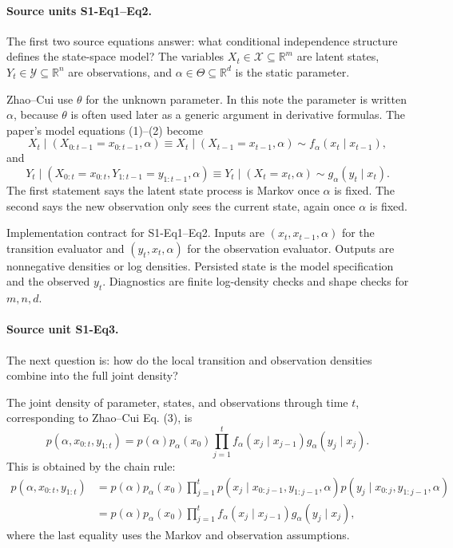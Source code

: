 \documentclass[11pt]{article}
\newcommand{\R}{\mathbb R}
\begin{document}
\paragraph{Source units S1-Eq1--Eq2.}
The first two source equations answer: what conditional independence structure
defines the state-space model?  The variables \(X_t\in\mathcal X\subseteq\R^m\)
are latent states, \(Y_t\in\mathcal Y\subseteq\R^n\) are observations, and
\(\alpha\in\Theta\subseteq\R^d\) is the static parameter.

Zhao--Cui use \(\theta\) for the unknown parameter.  In this note the parameter
is written \(\alpha\), because \(\theta\) is often used later as a generic
argument in derivative formulas.  The paper's model equations (1)--(2) become
\[
    X_t\mid (X_{0:t-1}=x_{0:t-1},\alpha)
    \equiv
    X_t\mid (X_{t-1}=x_{t-1},\alpha)
    \sim f_\alpha(x_t\mid x_{t-1}),
    \tag{BF-1}
\]
and
\[
    Y_t\mid (X_{0:t}=x_{0:t},Y_{1:t-1}=y_{1:t-1},\alpha)
    \equiv
    Y_t\mid (X_t=x_t,\alpha)
    \sim g_\alpha(y_t\mid x_t).
    \tag{BF-2}
\]
The first statement says the latent state process is Markov once \(\alpha\) is
fixed.  The second says the new observation only sees the current state, again
once \(\alpha\) is fixed.

Implementation contract for S1-Eq1--Eq2.  Inputs are \((x_t,x_{t-1},\alpha)\)
for the transition evaluator and \((y_t,x_t,\alpha)\) for the observation
evaluator.  Outputs are nonnegative densities or log densities.  Persisted
state is the model specification and the observed \(y_t\).  Diagnostics are
finite log-density checks and shape checks for \(m,n,d\).

\paragraph{Source unit S1-Eq3.}
The next question is: how do the local transition and observation densities
combine into the full joint density?

The joint density of parameter, states, and observations through time \(t\),
corresponding to Zhao--Cui Eq. (3), is
\[
    p(\alpha,x_{0:t},y_{1:t})
    =
    p(\alpha)p_\alpha(x_0)
    \prod_{j=1}^{t}
    f_\alpha(x_j\mid x_{j-1})g_\alpha(y_j\mid x_j).
    \tag{BF-3}
\]
This is obtained by the chain rule:
\[
\begin{aligned}
 p(\alpha,x_{0:t},y_{1:t})
 &=
 p(\alpha)p_\alpha(x_0)
 \prod_{j=1}^t
 p(x_j\mid x_{0:j-1},y_{1:j-1},\alpha)
 p(y_j\mid x_{0:j},y_{1:j-1},\alpha)\\
 &=
 p(\alpha)p_\alpha(x_0)
 \prod_{j=1}^t
 f_\alpha(x_j\mid x_{j-1})g_\alpha(y_j\mid x_j),
\end{aligned}
\]
where the last equality uses the Markov and observation assumptions.
\end{document}
